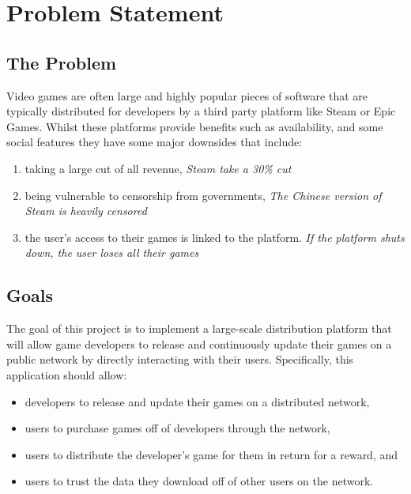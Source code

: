 
\chapter{Problem Statement}

\section{The Problem}
\label{sec:problem}

Video games are often large and highly popular pieces of software that are typically distributed for developers by a third party platform like Steam or Epic Games. Whilst these platforms provide benefits such as availability, and some social features they have some major downsides that include:
\vspace{1mm}
\begin{enumerate}[label=(\alph*)]
  \item taking a large cut of all revenue, \newline\textit{Steam take a 30\% cut~\cite{marks_report_2019,brown_valve_2021}}
  \item being vulnerable to censorship from governments, \newline\textit{The Chinese version of Steam is heavily censored~\cite{steamdb_steam_2021}}
  \item the user's access to their games is linked to the platform. \newline\textit{If the platform shuts down, the user loses all their games}
\end{enumerate}
\vspace{1mm}

\section{Goals}

The goal of this project is to implement a large-scale distribution platform that will allow game developers to release and continuously update their games on a public network by directly interacting with their users. Specifically, this application should allow:

\begin{itemize}
  \item developers to release and update their games on a distributed network,
  \item users to purchase games off of developers through the network,
  \item users to distribute the developer's game for them in return for a reward, and
  \item users to trust the data they download off of other users on the network.
\end{itemize}


